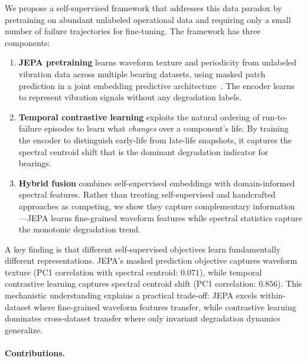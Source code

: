 We propose a self-supervised framework that addresses this data paradox by pretraining on abundant unlabeled operational data and requiring only a small number of failure trajectories for fine-tuning. The framework has three components:

\begin{enumerate}[nosep]
  \item \textbf{JEPA pretraining} learns waveform texture and periodicity from unlabeled vibration data across multiple bearing datasets, using masked patch prediction in a joint embedding predictive architecture~\citep{assran2023ijepa}. The encoder learns to represent vibration signals without any degradation labels.

  \item \textbf{Temporal contrastive learning} exploits the natural ordering of run-to-failure episodes to learn what \emph{changes} over a component's life. By training the encoder to distinguish early-life from late-life snapshots, it captures the spectral centroid shift that is the dominant degradation indicator for bearings.

  \item \textbf{Hybrid fusion} combines self-supervised embeddings with domain-informed spectral features. Rather than treating self-supervised and handcrafted approaches as competing, we show they capture complementary information---JEPA learns fine-grained waveform features while spectral statistics capture the monotonic degradation trend.
\end{enumerate}


A key finding is that different self-supervised objectives learn fundamentally different representations. JEPA's masked prediction objective captures waveform texture (PC1 correlation with spectral centroid: $0.071$), while temporal contrastive learning captures spectral centroid shift (PC1 correlation: $0.856$). This mechanistic understanding explains a practical trade-off: JEPA excels within-dataset where fine-grained waveform features transfer, while contrastive learning dominates cross-dataset transfer where only invariant degradation dynamics generalize.

\paragraph{Contributions.}

